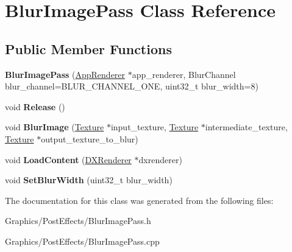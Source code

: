 \hypertarget{classBlurImagePass}{}\section{Blur\+Image\+Pass Class Reference}
\label{classBlurImagePass}
\subsection*{Public Member Functions}
\begin{DoxyCompactItemize}
\item 
\mbox{\label{classBlurImagePass_ab99b31ba1ad13f815e3664a8c11cd626}} 
{\bfseries Blur\+Image\+Pass} (\hyperlink{classAppRenderer}{App\+Renderer} $\ast$app\+\_\+renderer, Blur\+Channel blur\+\_\+channel=B\+L\+U\+R\+\_\+\+C\+H\+A\+N\+N\+E\+L\+\_\+\+O\+NE, uint32\+\_\+t blur\+\_\+width=8)
\item 
\mbox{\label{classBlurImagePass_a668e5f8f964f342cb00b371d89fe316a}} 
void {\bfseries Release} ()
\item 
\mbox{\label{classBlurImagePass_a7d7936da71ce4cfa0d5ef34f4cdc2c8f}} 
void {\bfseries Blur\+Image} (\hyperlink{classTexture}{Texture} $\ast$input\+\_\+texture, \hyperlink{classTexture}{Texture} $\ast$intermediate\+\_\+texture, \hyperlink{classTexture}{Texture} $\ast$output\+\_\+texture\+\_\+to\+\_\+blur)
\item 
\mbox{\label{classBlurImagePass_a254314dc7811669ece0db791ce20f089}} 
void {\bfseries Load\+Content} (\hyperlink{classDXRenderer}{D\+X\+Renderer} $\ast$dxrenderer)
\item 
\mbox{\label{classBlurImagePass_aa921dc3afee017718ade91551868addc}} 
void {\bfseries Set\+Blur\+Width} (uint32\+\_\+t blur\+\_\+width)
\end{DoxyCompactItemize}


The documentation for this class was generated from the following files\+:\begin{DoxyCompactItemize}
\item 
Graphics/\+Post\+Effects/Blur\+Image\+Pass.\+h\item 
Graphics/\+Post\+Effects/Blur\+Image\+Pass.\+cpp\end{DoxyCompactItemize}
